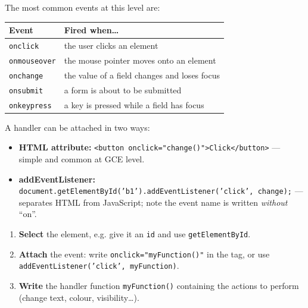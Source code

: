 \documentclass[11pt]{article}
\begin{document}
The most common events at this level are:

\begin{center}
\begin{tabularx}{\linewidth}{|l|X|}
\hline
\rowcolor{popblueL} \textbf{Event} & \textbf{Fired when\ldots} \\
\hline
\texttt{onclick} & the user clicks an element \\
\hline
\texttt{onmouseover} & the mouse pointer moves onto an element \\
\hline
\texttt{onchange} & the value of a field changes and loses focus \\
\hline
\texttt{onsubmit} & a form is about to be submitted \\
\hline
\texttt{onkeypress} & a key is pressed while a field has focus \\
\hline
\end{tabularx}
\end{center}

A handler can be attached in two ways:
\begin{itemize}
\item \textbf{HTML attribute:} \texttt{<button onclick="change()">Click</button>} — simple and common at GCE level.
\item \textbf{addEventListener:} \texttt{document.getElementById('b1').addEventListener('click', change);} — separates HTML from JavaScript; note the event name is written \emph{without} ``on''.
\end{itemize}

\begin{methode}
\begin{enumerate}
\item \textbf{Select} the element, e.g. give it an \texttt{id} and use \texttt{getElementById}.
\item \textbf{Attach} the event: write \texttt{onclick="myFunction()"} in the tag, or use \texttt{addEventListener('click', myFunction)}.
\item \textbf{Write} the handler function \texttt{myFunction()} containing the actions to perform (change text, colour, visibility\ldots).
\end{enumerate}
\end{methode}
\end{document}
